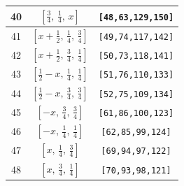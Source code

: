 \documentclass[fleqn,8pt]{jsarticle}
\begin{document}
\begin{longtable}{ccc}
40 & $\left[ \frac{3}{4},\, \frac{1}{4},\, x \right]$ & {\tt [48,63,129,150]} \\ \hline
41 & $\left[ x + \frac{1}{2},\, \frac{1}{4},\, \frac{3}{4} \right]$ & {\tt [49,74,117,142]} \\ \hline
42 & $\left[ x + \frac{1}{2},\, \frac{3}{4},\, \frac{1}{4} \right]$ & {\tt [50,73,118,141]} \\ \hline
43 & $\left[ \frac{1}{2} - x,\, \frac{1}{4},\, \frac{1}{4} \right]$ & {\tt [51,76,110,133]} \\ \hline
44 & $\left[ \frac{1}{2} - x,\, \frac{3}{4},\, \frac{3}{4} \right]$ & {\tt [52,75,109,134]} \\ \hline
45 & $\left[ - x,\, \frac{3}{4},\, \frac{3}{4} \right]$ & {\tt [61,86,100,123]} \\ \hline
46 & $\left[ - x,\, \frac{1}{4},\, \frac{1}{4} \right]$ & {\tt [62,85,99,124]} \\ \hline
47 & $\left[ x,\, \frac{1}{4},\, \frac{3}{4} \right]$ & {\tt [69,94,97,122]} \\ \hline
48 & $\left[ x,\, \frac{3}{4},\, \frac{1}{4} \right]$ & {\tt [70,93,98,121]} \\
\end{longtable}
\renewcommand{\arraystretch}{1.2}
\end{document}
